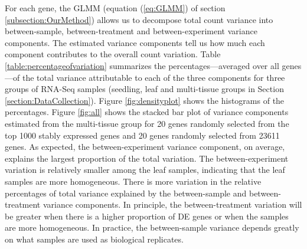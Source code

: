 		For each gene, the GLMM (equation (\ref{eq:GLMM}) of section
		\ref{subsection:OurMethod}) allows us to decompose total count variance into
		between-sample, between-treatment and between-experiment variance components.
		The estimated variance components tell us how much each component contributes
		to the overall count variation. Table \ref{table:percentageofvariation}
		summarizes the percentages---averaged over all genes---of the total variance
		attributable to each of the three components for three groups of RNA-Seq
		samples (seedling, leaf and multi-tissue groups in Section
		\ref{section:DataCollection}). Figure \ref{fig:densityplot} shows the
		histograms of the percentages.  Figure \ref{fig:all} shows the stacked bar
		plot of variance components estimated from the multi-tissue group for 20 genes
		randomly selected from the top 1000 stably expressed genes and 20 genes
		randomly selected from 23611 genes.  As expected, the between-experiment
		variance component, on average, explains the largest proportion of the total
		variation. The between-experiment variation is relatively smaller among the
		leaf samples, indicating that the leaf samples are more homogeneous.  There is
		more variation in the relative percentages of total variance explained by the
		between-sample and between-treatment variance components. In principle, the
		between-treatment variation will be greater when there is a higher proportion
		of DE genes or when the samples are more homogeneous. In practice, the
		between-sample variance depends greatly on what samples are used as biological
		replicates. 
		
		

